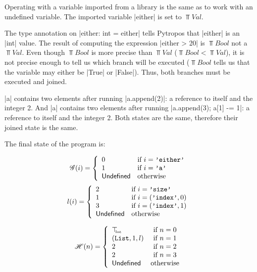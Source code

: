 \begin{itemize}
  Operating with a variable imported from a library is the same as to work with an
  undefined variable. The imported variable \pycode|either| is set to $\Top{Val}$.

  The type annotation on \pycode|either: int = either| tells Pytropos that \pycode|either|
  is an \pycode|int| value. The result of computing the expression \pycode|either > 20| is
  $\Top{Bool}$ not a $\Top{Val}$. Even though $\Top{Bool}$ is more precise than
  $\Top{Val}$ ($\Top{Bool} < \Top{Val}$), it is not precise enough to tell us which
  branch will be executed ($\Top{Bool}$ tells us that the variable may either be
  \pycode|True| or \pycode|False|). Thus, both branches must be executed and joined.

  \pycode|a| contains two elements after running \pycode|a.append(2)|: a reference to
  itself and the integer 2.  And \pycode|a| contains two elements after running
  \pycode|a.append(3); a[1] -= 1|: a reference to itself and the integer 2. Both states
  are the same, therefore their joined state is the same.

  The final state of the program is:

\begin{minipage}{0.45\textwidth}
  \[\mathscr{G}(i) = \left\{
    \begin{array}{ll}
      0 & \text{if } i = \texttt{'either'} \\
      1 & \text{if } i = \texttt{'a'} \\
      \mathsf{Undefined}      & \text{otherwise} \\
    \end{array}
  \right.\]
  \[l(i) = \left\{
    \begin{array}{ll}
      2 & \text{if } i = \texttt{'size'} \\
      1 & \text{if } i = (\texttt{'index'}, 0) \\
      3 & \text{if } i = (\texttt{'index'}, 1) \\
      \mathsf{Undefined}      & \text{otherwise} \\
    \end{array}
  \right.\]
\end{minipage}\hfill%
\begin{minipage}{0.45\textwidth}
  \[\mathscr{H}(n) = \left\{
    \begin{array}{lcl}
      \top_{\hspace{-1mm}{\text{\tiny{Int}}}} & \text{if } n = 0 \\
      (\texttt{List}, 1, l) & \text{if } n = 1 \\
      2 & \text{if } n = 2 \\
      2 & \text{if } n = 3 \\
      \mathsf{Undefined} & \text{otherwise} \\
    \end{array}
  \right.\]
\end{minipage}\hfill\\[0.4em]


\end{itemize}
